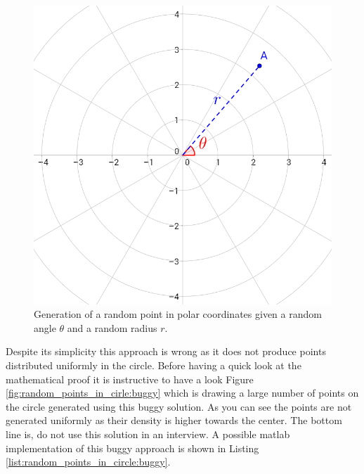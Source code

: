 \begin{figure}
	\label{fig:random_points_in_cirle:polar_coordinates}
	\centering
	\includegraphics[scale=0.3]{sources/random_points_in_circle/images/polar-coordinate}
	\caption{Generation of a random point in polar coordinates given a random angle $\theta$ and a random radius $r$.}
\end{figure}

Despite its simplicity this approach is wrong as it does not produce points distributed uniformly in the circle. Before having a quick look at the mathematical proof it is instructive to have a look Figure \ref{fig:random_points_in_cirle:buggy} which is drawing a large number of points on the circle generated using this buggy solution. As you can see the points are not generated uniformly as their density is higher towards the center. 
The bottom line is, do not use this solution in an interview. A possible matlab implementation of this buggy approach is shown in Listing \ref{list:random_points_in_circle:buggy}.



